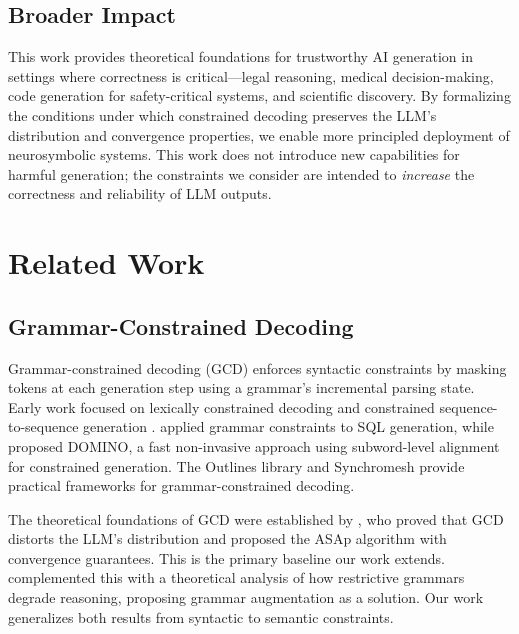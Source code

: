\documentclass[twoside,11pt]{article}
\begin{document}
\subsection{Broader Impact}
\label{sec:broader-impact}

This work provides theoretical foundations for trustworthy AI generation in
settings where correctness is critical---legal reasoning, medical
decision-making, code generation for safety-critical systems, and scientific
discovery. By formalizing the conditions under which constrained decoding
preserves the LLM's distribution and convergence properties, we enable more
principled deployment of neurosymbolic systems. This work does not introduce
new capabilities for harmful generation; the constraints we consider are
intended to \emph{increase} the correctness and reliability of LLM outputs.

\section{Related Work}
\label{sec:related}

\subsection{Grammar-Constrained Decoding}
\label{sec:related-gcd}

Grammar-constrained decoding (GCD) enforces syntactic constraints by masking
tokens at each generation step using a grammar's incremental parsing state.
Early work focused on lexically constrained decoding
\citep{hokamp2017lexically} and constrained sequence-to-sequence generation
\citep{post2018fast}. \citet{scholak2021picard} applied grammar constraints
to SQL generation, while \citet{beurerkellner2024domino} proposed DOMINO, a
fast non-invasive approach using subword-level alignment for constrained
generation. The Outlines library \citep{willard2023outlines} and
Synchromesh \citep{poesia2022synchromesh} provide practical frameworks for
grammar-constrained decoding.

The theoretical foundations of GCD were established by
\citet{ugare2024gad}, who proved that GCD distorts the LLM's distribution
and proposed the ASAp algorithm with convergence guarantees. This is the
primary baseline our work extends. \citet{banerjee2025crane} complemented
this with a theoretical analysis of how restrictive grammars degrade
reasoning, proposing grammar augmentation as a solution. Our work
generalizes both results from syntactic to semantic constraints.
\end{document}
